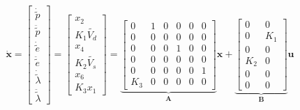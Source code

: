 \begin{equation}\label{eq:state_matrices_P4p1}
    \mathbf{\dot{x}} = 
    \begin{bmatrix} 
        \dot{\tilde{p}} \\ 
        \ddot{\tilde{p}} \\ 
        \dot{\tilde{e}} \\ 
        \ddot{\tilde{e}} \\ 
        \dot{\tilde{\lambda}}\\ 
        \ddot{\tilde{\lambda}} 
    \end{bmatrix} = 
    \begin{bmatrix} 
        x_{2}\\ 
        K_1\tilde{V_d}\\ 
        x_4\\ 
        K_2\tilde{V_s}\\ 
        x_6\\ 
        K_3 x_1 
    \end{bmatrix} =
    \underbrace{
    \begin{bmatrix}
        0 & 1 & 0 & 0 & 0 & 0 \\
        0 & 0 & 0 & 0 & 0 & 0 \\
        0 & 0 & 0 & 1 & 0 & 0 \\
        0 & 0 & 0 & 0 & 0 & 0 \\
        0 & 0 & 0 & 0 & 0 & 1 \\
        K_3 & 0 & 0 & 0 & 0 & 0
    \end{bmatrix}}_\mathbf{A}\mathbf{x} + 
    \underbrace{
    \begin{bmatrix}
        0 & 0 \\
        0 & K_1 \\
        0 & 0 \\
        K_2 & 0 \\
        0 & 0 \\
        0 & 0 
    \end{bmatrix}}_\mathbf{B}\mathbf{u}
\end{equation}

